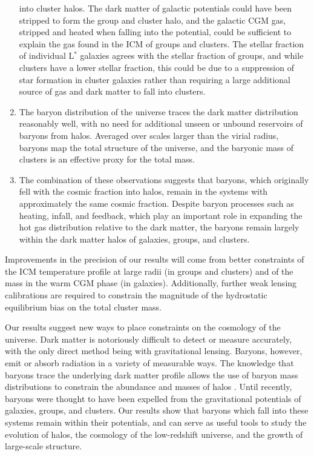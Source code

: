 \begin{enumerate}
  into cluster halos. The dark matter of galactic potentials could
  have been stripped to form the group and cluster halo, and the
  galactic CGM gas, stripped and heated when falling into the
  potential, could be sufficient to explain the gas found in the ICM
  of groups and clusters. The stellar fraction of individual L$^*$
  galaxies agrees with the stellar fraction of groups, and while
  clusters have a lower stellar fraction, this could be due to a
  suppression of star formation in cluster galaxies rather than
  requiring a large additional source of gas and dark matter to fall
  into clusters.
\item The baryon distribution of the universe traces the dark matter
  distribution reasonably well, with no need for additional unseen or
  unbound reservoirs of baryons from halos. Averaged over scales
  larger than the virial radius, baryons map the total structure of
  the universe, and the baryonic mass of clusters is an effective
  proxy for the total mass.
\item The combination of these observations suggests that baryons,
  which originally fell with the cosmic fraction into halos, remain in
  the systems with approximately the same cosmic fraction. Despite
  baryon processes such as heating, infall, and feedback, which play
  an important role in expanding the hot gas distribution relative to
  the dark matter, the baryons remain largely within the dark matter
  halos of galaxies, groups, and clusters.
\end{enumerate}

Improvements in the precision of our results will come from better
constraints of the ICM temperature profile at large radii (in groups
and clusters) and of the mass in the warm CGM phase (in
galaxies). Additionally, further weak lensing calibrations are
required to constrain the magnitude of the hydrostatic equilibrium
bias on the total cluster mass.

Our results suggest new ways to place constraints on the cosmology of
the universe. Dark matter is notoriously difficult to detect or
measure accurately, with the only direct method being with
gravitational lensing. Baryons, however, emit or absorb radiation in a
variety of measurable ways. The knowledge that baryons trace the
underlying dark matter profile allows the use of baryon mass
distributions to constrain the abundance and masses of halos
. Until recently, baryons were thought to have
been expelled from the gravitational potentials of galaxies, groups,
and clusters. Our results show that baryons which fall into these
systems remain within their potentials, and can serve as useful tools
to study the evolution of halos, the cosmology of the low-redshift
universe, and the growth of large-scale structure.

